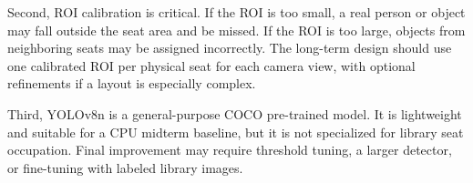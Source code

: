 Second, ROI calibration is critical. If the ROI is too small, a real person or object may fall outside the seat area and be missed. If the ROI is too large, objects from neighboring seats may be assigned incorrectly. The long-term design should use one calibrated ROI per physical seat for each camera view, with optional refinements if a layout is especially complex.

Third, YOLOv8n is a general-purpose COCO pre-trained model. It is lightweight and suitable for a CPU midterm baseline, but it is not specialized for library seat occupation. Final improvement may require threshold tuning, a larger detector, or fine-tuning with labeled library images.
